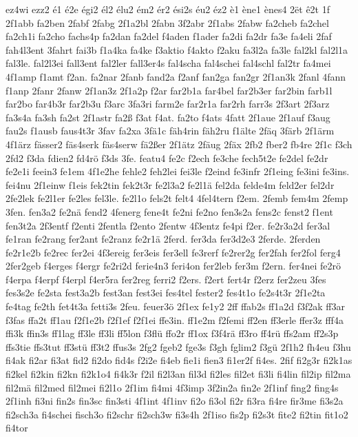 {ez4wi
ezz2
é1
é2e
égi2
él2
élu2
ém2
ér2
ési2s
éu2
éz2
è1
ène1
ènes4
2ët
ê2t
1f
2f1abb
fa2ben
2fabf
2fabg
2f1a2bl
2fabn
3f2abr
2f1abs
2fabw
fa2cheb
fa2chel
fa2ch1i
fa2cho
fachs4p
fa2dan
fa2del
f4aden
f1ader
fa2di
fa2dr
fa3e
fa4eli
2faf
fah4l3ent
3fahrt
fai3b
f1a4ka
fa4ke
f3aktio
f4akto
f2aku
fa3l2a
fa3le
fal2kl
fal2l1a
fal3le.
fal2l3ei
fall3ent
fal2ler
fall3er4s
fal4scha
fal4schei
fal4schl
fal2tr
fa4mei
4f1amp
f1amt
f2an.
fa2nar
2fanb
fand2a
f2anf
fan2ga
fan2gr
2f1an3k
2fanl
4fann
f1anp
2fanr
2fanw
2f1an3z
2f1a2p
f2ar
far2b1a
far4bel
far2b3er
far2bin
farb1l
far2bo
far4b3r
far2b3u
f3arc
3fa3ri
farm2e
far2r1a
far2rh
farr3s
2f3art
2f3arz
fa3s4a
fa3sh
fa2st
2f1astr
fa2ß
f3at
f4at.
fa2to
f4ats
4fatt
2f1aue
2f1auf
f3aug
fau2s
f1ausb
faus4t3r
3fav
fa2xa
3fä1c
fäh4rin
fäh2ru
f1älte
2fäq
3färb
2f1ärm
4f1ärz
fässer2
fäs4serk
fäs4serw
fä2ßer
2f1ätz
2fäug
2fäx
2fb2
fber2
fb4re
2f1c
f3ch
2fd2
f3da
fdien2
fd4rö
f3ds
3fe.
featu4
fe2c
f2ech
fe3che
fech5t2e
fe2del
fe2dr
fe2e1i
feein3
fe1em
4f1e2he
fehle2
feh2lei
fei3le
f2eind
fe3infr
2f1eing
fe3ini
fe3ins.
fei4nu
2f1einw
f1eis
fek2tin
fek2t3r
fe2l3a2
fe2l1ä
fel2da
felde4m
feld2er
fel2dr
2fe2lek
fe2l1er
fe2les
fel3le.
fe2l1o
fels2t
felt4
4fel4tern
f2em.
2femb
fem4m
2femp
3fen.
fen3a2
fe2nä
fend2
4fenerg
fene4t
fe2ni
fe2no
fen3s2a
fens2c
fenst2
f1ent
fen3t2a
2f3entf
f2enti
2fentla
f2ento
2fentw
4f3entz
fe4pi
f2er.
fe2r3a2d
fer3al
fe1ran
fe2rang
fer2ant
fe2ranz
fe2r1ä
2ferd.
fer3da
fer3d2e3
2ferde.
2ferden
fe2r1e2b
fe2rec
fer2ei
4f3ereig
fer3eis
fer3ell
fe3rerf
fe2rer2g
fer2fah
fer2fol
ferg4
2fer2geb
f4erges
f4ergr
fe2ri2d
ferie4n3
feri4on
fer2leb
fer3m
f2ern.
fer4nei
fe2rö
f4erpa
f4erpf
f4erpl
f4er5ra
fer2reg
ferri2
f2ers.
f2ert
fert4r
f2erz
fer2zeu
3fes
fes3s2e
fe2sta
fest3a2b
fest3an
fest3ei
fes4tel
fester2
fes4t1o
fe2s4t3r
2f1e2ta
fe4tag
fe2th
fet4t3a
fetti3s
2feu.
feuer3ö
2f1ex
fe1y2
2ff
ffab2s
ff1a2d
f3f2ak
ff3ar
f3fas
ffa2t
ff1au
f2f1e2b
f2f1ef
f2f1ei
ffe3in.
ff1e2m
f2femi
ff2en
ff3erle
ffer3z
fff4a
ffi3k
ffin3s
ff1lag
ff3le
ff3li
ff5lon
f3flü
ffo2r
ff1ox
f3f4rä
ff3ro
ff4rü
ffs2am
ff2s3p
ffs3tie
ffs3tut
ff3stü
ff3t2
ffus3s
2fg2
fgeb2
fge3s
f3gh
fglim2
f3gü
2f1h2
fh4eu
f3hu
fi4ak
fi2ar
fi3at
fid2
fi2do
fid4s
f2i2e
fi4eb
fie1i
fien3
fi1er2f
fi4es.
2fif
fi2g3r
fi2k1as
fi2kel
fi2kin
fi2kn
fi2k1o4
fi4k3r
f2il
fi2l3an
fil3d
fi2les
fil2et
fi3li
fi4lin
fil2ip
fil2ma
fil2mä
fil2med
fil2mei
fi2l1o
2f1im
fi4mi
4f3imp
3f2in2a
fin2e
2f1inf
fing2
fing4s
2f1inh
fi3ni
fin2s
fin3sc
fin3sti
4f1int
4f1inv
fi2o
fi3ol
fi2r
fi3ra
fi4re
fir3me
fi3s2a
fi2sch3a
fi4schei
fisch3o
fi2schr
fi2sch3w
fi3s4h
2f1iso
fis2p
fi2s3t
fite2
fi2tin
fit1o2
fi4tor
}
